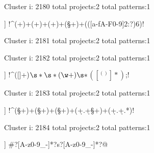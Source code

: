 Cluster i: 2180
total projects:2
total patterns:1
\begin{multicols}{1}
\begin{description}[noitemsep,topsep=0pt]
\item [[2] ] \cverb!^(\w+)\s+(\w+)\s+(\w+)\s+(\S+)\s+(([a-fA-F0-9]{2}:?){6})!
\end{description}
\end{multicols}







Cluster i: 2181
total projects:2
total patterns:1
\begin{multicols}{1}
\end{multicols}







Cluster i: 2182
total projects:2
total patterns:1
\begin{multicols}{1}
\begin{description}[noitemsep,topsep=0pt]
\item [[2] ] \cverb!^\s*([\w\s\*]+)\(\s*\*\s*(\w+)\s*\)\s*\(([^()]*)\);!
\end{description}
\end{multicols}







Cluster i: 2183
total projects:2
total patterns:1
\begin{multicols}{1}
\begin{description}[noitemsep,topsep=0pt]
\item [[2] ] \cverb!^(\S+)\s+(\S+)\s+(\S+)\s+(\d+.\d+\s\S+)\s+(\d+.\d+.*)!
\end{description}
\end{multicols}







Cluster i: 2184
total projects:2
total patterns:1
\begin{multicols}{1}
\begin{description}[noitemsep,topsep=0pt]
\item [[2] ] \cverb@\<\!\-\-\#\s?[A-z0-9_-]*\s?\:s?[A-z0-9\s_-]*\s?\-\-\>@
\end{description}
\end{multicols}







